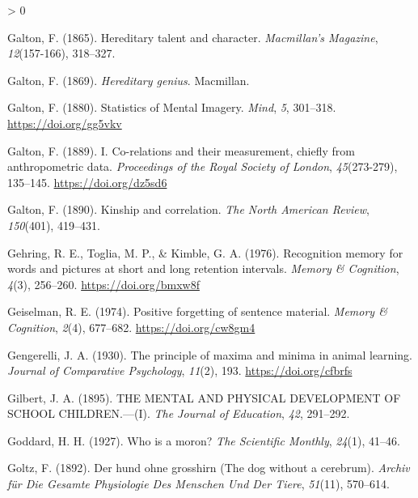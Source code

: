 \documentclass[
  oneside,
  12pt]{crumpbook}
\newlength{\cslhangindent}
\newenvironment{CSLReferences}[2] %
 {%
  \setlength{\parindent}{0pt}
  \ifodd #1 \everypar{\setlength{\hangindent}{\cslhangindent}}\ignorespaces\fi
  \ifnum #2 > 0
  \setlength{\parskip}{#2\baselineskip}
  \fi
 }%
 {}
\begin{document}
\begin{CSLReferences}{1}{0}
\leavevmode\hypertarget{ref-galtonHereditaryTalentCharacter1865}{}%
Galton, F. (1865). Hereditary talent and character. \emph{Macmillan's Magazine}, \emph{12}(157-166), 318--327.

\leavevmode\hypertarget{ref-galtonHereditaryGenius1869}{}%
Galton, F. (1869). \emph{Hereditary genius}. {Macmillan}.

\leavevmode\hypertarget{ref-galtonStatisticsMentalImagery1880}{}%
Galton, F. (1880). Statistics of {Mental Imagery}. \emph{Mind}, \emph{5}, 301--318. \url{https://doi.org/gg5vkv}

\leavevmode\hypertarget{ref-galtonCorelationsTheirMeasurement1889}{}%
Galton, F. (1889). I. {Co}-relations and their measurement, chiefly from anthropometric data. \emph{Proceedings of the Royal Society of London}, \emph{45}(273-279), 135--145. \url{https://doi.org/dz5sd6}

\leavevmode\hypertarget{ref-galtonKinshipCorrelation1890}{}%
Galton, F. (1890). Kinship and correlation. \emph{The North American Review}, \emph{150}(401), 419--431.

\leavevmode\hypertarget{ref-gehringRecognitionMemoryWords1976}{}%
Gehring, R. E., Toglia, M. P., \& Kimble, G. A. (1976). Recognition memory for words and pictures at short and long retention intervals. \emph{Memory \& Cognition}, \emph{4}(3), 256--260. \url{https://doi.org/bmxw8f}

\leavevmode\hypertarget{ref-geiselmanPositiveForgettingSentence1974}{}%
Geiselman, R. E. (1974). Positive forgetting of sentence material. \emph{Memory \& Cognition}, \emph{2}(4), 677--682. \url{https://doi.org/cw8gm4}

\leavevmode\hypertarget{ref-gengerelliPrincipleMaximaMinima1930}{}%
Gengerelli, J. A. (1930). The principle of maxima and minima in animal learning. \emph{Journal of Comparative Psychology}, \emph{11}(2), 193. \url{https://doi.org/cfbrfs}

\leavevmode\hypertarget{ref-gilbertMENTALPHYSICALDEVELOPMENT1895}{}%
Gilbert, J. A. (1895). {THE MENTAL AND PHYSICAL DEVELOPMENT OF SCHOOL CHILDREN}.---({I}). \emph{The Journal of Education}, \emph{42}, 291--292.

\leavevmode\hypertarget{ref-goddardWhoMoron1927}{}%
Goddard, H. H. (1927). Who is a moron? \emph{The Scientific Monthly}, \emph{24}(1), 41--46.

\leavevmode\hypertarget{ref-goltzHundOhneGrosshirn1892}{}%
Goltz, F. (1892). Der hund ohne grosshirn ({The} dog without a cerebrum). \emph{Archiv für Die Gesamte Physiologie Des Menschen Und Der Tiere}, \emph{51}(11), 570--614.


\end{CSLReferences}
\end{document}
